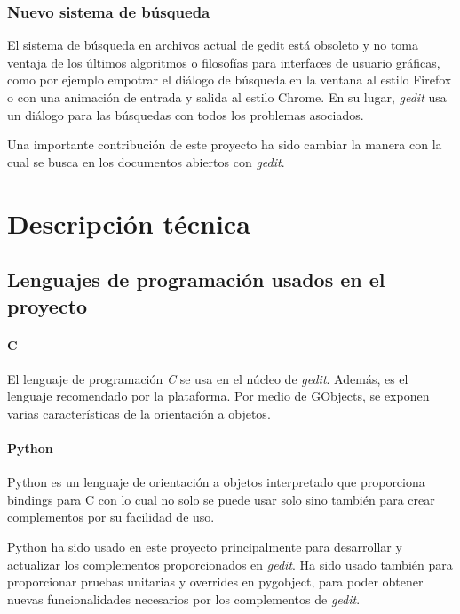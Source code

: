 \subsubsection{Nuevo sistema de búsqueda}

El sistema de búsqueda en archivos actual de gedit está obsoleto y no toma
ventaja de los últimos algoritmos o filosofías para interfaces de usuario
gráficas, como por ejemplo empotrar el diálogo de búsqueda en la ventana
al estilo Firefox o con una animación de entrada y salida al estilo Chrome.
En su lugar, \emph{gedit} usa un diálogo para las búsquedas con todos los problemas
asociados.

Una importante contribución de este proyecto ha sido cambiar la manera con la
cual se busca en los documentos abiertos con \emph{gedit}.

\section{Descripción técnica}

\subsection{Lenguajes de programación usados en el proyecto}

\paragraph{C}

El lenguaje de programación \emph{C} se usa en el núcleo de \emph{gedit}.
Además, es el lenguaje recomendado por la plataforma. Por medio de GObjects,
se exponen varias características de la orientación a objetos.

\paragraph{Python}

Python es un lenguaje de orientación a objetos interpretado que proporciona
bindings para C con lo cual no solo se puede usar solo sino también para
crear complementos por su facilidad de uso.

Python ha sido usado en este proyecto principalmente para desarrollar y actualizar
los complementos proporcionados en \emph{gedit}. Ha sido usado también para
proporcionar pruebas unitarias y overrides en pygobject, para poder obtener
nuevas funcionalidades necesarios por los complementos de \emph{gedit}.

